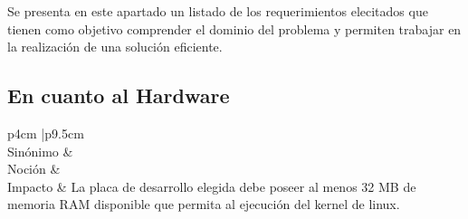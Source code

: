 Se presenta en este apartado un listado de los requerimientos elecitados que tienen como objetivo comprender el dominio del problema y permiten
	trabajar en la realización de una solución eficiente.
	
		\subsection{En cuanto al Hardware}
		\begin{table}[h]
		\centering
		\begin{tabular}{ p{4cm} |p{9.5cm} }
		\hline 
		 \\
		\hline
		Sinónimo  &   \\
		\hline
		Noción &  \\
		\hline
		Impacto & La placa de desarrollo elegida debe poseer al menos 32 MB de memoria RAM disponible que permita al ejecución del kernel de linux.\\
		\hline
		\end{tabular}
		\caption{LEL}
		\label{tab:requsr1}
		\end{table}
					


